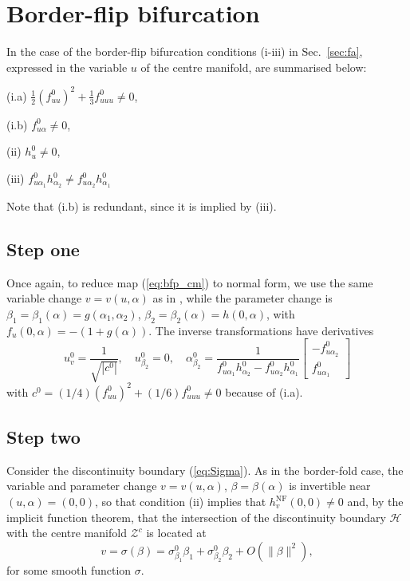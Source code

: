 \documentclass[final,onefignum]{siamltex}
\begin{document}
\section{Border-flip bifurcation}
In the case of the border-flip bifurcation conditions (i-iii) in Sec.~\ref{sec:fa}, expressed in the variable $u$ of the centre manifold, are summarised below:
\begin{list}{C}{}
 \item[(i.a)] ${\displaystyle \frac{\displaystyle {1}}{\displaystyle {2}}}(f_{uu}^0)^2+{\displaystyle \frac{\displaystyle {1}}{\displaystyle {3}}}f_{uuu}^0\neq 0$,
 \item[(i.b)] $f_{u\alpha}^0\neq 0$,
 \item[(ii)] $h_u^0\neq 0$,
 \item[(iii)] $f_{u\alpha_1}^0h_{\alpha_2}^0\neq f_{u\alpha_2}^0h_{\alpha_1}^0$
\end{list}
Note that (i.b) is redundant, since it is implied by (iii).

\subsection{Step one}
Once again, to reduce map (\ref{eq:bfp_cm}) to normal form, we use the same variable change $v=v(u,\alpha)$ as in \citep{Kuznetsov04}, while the parameter change is $\beta_1 = \beta_1(\alpha) = g(\alpha_1,\alpha_2)$, $\beta_2 = \beta_2(\alpha) = h(0,\alpha)$, with $f_u(0,\alpha)=-(1+g(\alpha))$.  The inverse transformations have derivatives
$$
u_{v}^0={\displaystyle \frac{\displaystyle {1}}{\displaystyle {\sqrt{|c^0|}}}},\quad
u_{\beta_2}^0=0,\quad
\alpha_{\beta_2}^0={\displaystyle \frac{\displaystyle {1}}{\displaystyle {f^0_{u\alpha_1}h^0_{\alpha_2}-f^0_{u\alpha_2}h^0_{\alpha_1}}}}
\left[\begin{array}{c}
 -f_{u\alpha_2}^0\\
  f_{u\alpha_1}^0
\end{array}\right]
$$
with $c^0=(1/4)(f_{uu}^0)^2+(1/6)f_{uuu}^0\neq 0$ because of (i.a).

\subsection{Step two}
Consider the discontinuity boundary (\ref{eq:Sigma}).  As in the border-fold case, the variable and parameter change $v=v(u,\alpha)$, $\beta=\beta(\alpha)$ is invertible
near $(u,\alpha)=(0,0)$, so that condition (ii) implies
that $h^{\mathrm{NF}}_v(0,0)\neq 0$ and, by the implicit function theorem, that
the intersection of the discontinuity boundary $\mathcal{H}$
with the centre manifold $\mathcal{Z}^c$ is located at
$$
v=\sigma(\beta)=\sigma_{\beta_1}^0\beta_1+\sigma_{\beta_2}^0\beta_2+
O(\|\beta\|^2),
$$
for some smooth function $\sigma$.
\end{document}
